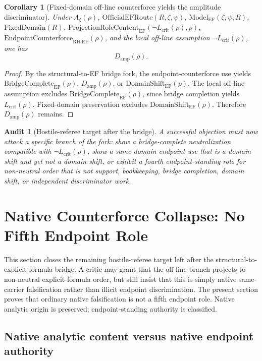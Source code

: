 \documentclass[11pt]{article}
\newtheorem{corollary}{Corollary}[section]
\newtheorem{audit}{Audit}[section]
\newcommand{\Az}{A_{\zeta}}
\newcommand{\Lcrit}{L_{\mathrm{crit}}}
\newcommand{\RH}{\mathrm{RH}}
\newcommand{\EF}{\mathrm{EF}}
\newcommand{\FixedDomain}{\mathrm{FixedDomain}}
\newcommand{\ModelEF}{\mathrm{Model}_{\mathrm{EF}}}
\newcommand{\OfficialEFRoute}{\mathrm{OfficialEFRoute}}
\newcommand{\Damp}{D_{\mathrm{amp}}}
\newcommand{\ProjRoleEF}{\mathrm{ProjectionRoleContent}_{\mathrm{EF}}}
\newcommand{\Counterforce}{\mathrm{EndpointCounterforce}}
\newcommand{\BridgeCompleteEF}{\mathrm{BridgeComplete}_{\mathrm{EF}}}
\newcommand{\DomainShiftEF}{\mathrm{DomainShift}_{\mathrm{EF}}}
\begin{document}
\begin{corollary}[Fixed-domain off-line counterforce yields the amplitude discriminator]
Under \(\Az(\rho)\), \(\OfficialEFRoute(R,\zeta,\psi)\), \(\ModelEF(\zeta,\psi,R)\), \(\FixedDomain(R)\), \(\ProjRoleEF(\neg\Lcrit(\rho),\rho)\), \(\Counterforce_{\RH\text{-}\EF}(\rho)\), and the local off-line assumption \(\neg\Lcrit(\rho)\), one has
\[
\Damp(\rho).
\]
\end{corollary}

\begin{proof}
By the structural-to-EF bridge fork, the endpoint-counterforce use yields \(\BridgeCompleteEF(\rho)\), \(\Damp(\rho)\), or \(\DomainShiftEF(\rho)\).  The local off-line assumption excludes \(\BridgeCompleteEF(\rho)\), since bridge completion yields \(\Lcrit(\rho)\).  Fixed-domain preservation excludes \(\DomainShiftEF(\rho)\).  Therefore \(\Damp(\rho)\) remains.
\end{proof}

\begin{audit}[Hostile-referee target after the bridge]
A successful objection must now attack a specific branch of the fork: show a bridge-complete neutralization compatible with \(\neg\Lcrit(\rho)\), show a same-domain endpoint use that is a domain shift and yet not a domain shift, or exhibit a fourth endpoint-standing role for non-neutral order that is not support, bookkeeping, bridge completion, domain shift, or independent discriminator work.
\end{audit}


\section{Native Counterforce Collapse: No Fifth Endpoint Role}\label{sec:native-counterforce-collapse}

This section closes the remaining hostile-referee target left after the structural-to-explicit-formula bridge.  A critic may grant that the off-line branch projects to non-neutral explicit-formula order, but still insist that this is simply native same-carrier falsification rather than illicit endpoint discrimination.  The present section proves that ordinary native falsification is not a fifth endpoint role.  Native analytic origin is preserved; endpoint-standing authority is classified.

\subsection{Native analytic content versus native endpoint authority}
\end{document}
